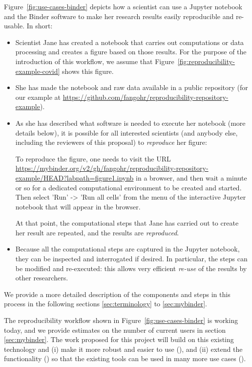 Figure~\ref{fig:use-cases-binder} depicts how a scientist can use a Jupyter
notebook and the Binder software to make her research results easily
reproducible and re-usable. In short:
\begin{itemize}
\item Scientist Jane has created a notebook that carries out computations or
  data processing and creates a figure based on those results. For the purpose
  of the introduction of this workflow, we assume that
  Figure~\ref{fig:reproducibility-example-covid} shows this figure.

\item She has made the notebook and raw data available in a public repository
  (for our example at\newline
  \mbox{\url{https://github.com/fangohr/reproducibility-repository-example}}).

\item As she has described what software is needed to execute her notebook (more
  details below), it is possible for all interested scientists (and anybody
  else, including the reviewers of this proposal) to \emph{reproduce} her
  figure:

  To reproduce the figure, one needs to visit the URL\newline
  \mbox{\url{https://mybinder.org/v2/gh/fangohr/reproducibility-repository-example/HEAD?labpath=figure1.ipynb}}
  in a browser, and then wait a minute or so for a dedicated computational
  environment to be created and started. Then select 'Run' -> 'Run all cells'
  from the menu of the interactive Jupyter notebook that will appear in the
  browser.

  At that point, the computational steps that Jane has carried out to create her
  result are repeated, and the results are \emph{reproduced}.
  
\item Because all the computational steps are captured in the Jupyter notebook,
  they can be inspected and interrogated if desired. In particular, the steps
  can be modified and re-executed: this allows very efficient \emph{re-use} of
  the results by other researchers.
\end{itemize}

We provide a more detailed description of the components and steps in this
process in the following sections \ref{sec:terminology} to \ref{sec:mybinder}.

The reproducibility workflow shown in Figure~\ref{fig:use-cases-binder} is
working today, and we provide estimates on the number of current users in
section \ref{sec:mybinder}. The work proposed for this project will build on
this existing technology and (i) make it more robust and easier to use
(), and (ii) extend the functionality () so
that the existing tools can be used in many more use cases
().

